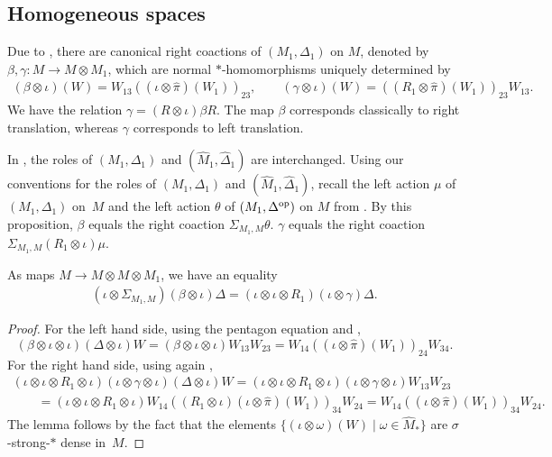 \subsection*{Homogeneous spaces}
Due to \cite[Proposition 3.1]{VaeVaiExt}, there are canonical right coactions of $(M_1, \Delta_1)$ on $M$, denoted by $\beta, \gamma: M \rightarrow M \otimes M_1$, which are normal $\ast$-homomorphisms uniquely determined by
\begin{gather}\label{EqnBeta}
 (\beta \otimes \iota)(W)  = W_{13} \left((\iota \otimes \hat{\pi})(W_1)\right)_{23}, \qquad
 (\gamma \otimes \iota)(W) =  \left((R_1 \otimes \hat{\pi})(W_1)\right)_{23} W_{13}.
\end{gather}
We have the relation $\gamma = (R \otimes \iota)  \beta  R$. The map $\beta$ corresponds classically to right translation, whereas $\gamma$ corresponds to left translation.

\begin{rmk}
 In \cite[Section 3]{VaeVaiExt}, the roles of $(M_1, \Delta_1)$ and $(\hat{M}_1, \hat{\Delta}_1)$ are interchanged. Using our conventions for the roles of $(M_1, \Delta_1)$ and $(\hat{M}_1, \hat{\Delta}_1)$, recall the left action $\mu$ of $(M_1, \Delta_1)$ on~$M$ and the left action $\theta$ of $(M_1, \Delta^{\rm op})$ on $M$ from \cite[Proposition~3.1]{VaeVaiExt}. By this proposition, $\beta$ equals the right coaction $\Sigma_{M_1, M}   \theta$. $\gamma$ equals the right coaction $\Sigma_{M_1, M} (R_1 \otimes \iota) \mu$.
\end{rmk}


\begin{lem}\label{LemInterchangeLR}
As maps $M \rightarrow M \otimes M \otimes M_1$, we have an equality
\begin{gather}
 (\iota \otimes \Sigma_{M_1, M}) (\beta \otimes \iota)  \Delta  = (\iota \otimes \iota \otimes R_1)(\iota \otimes \gamma) \Delta.\label{EqnGammaBetaRelI}
\end{gather}
\end{lem}
\begin{proof}
For the left hand side, using the pentagon equation and \cite[Proposition 3.1]{VaeVaiExt},
 \[
  (\beta \otimes \iota \otimes \iota)  (\Delta\otimes \iota) W = (\beta \otimes \iota \otimes \iota)  W_{13} W_{23} =
W_{14} ((\iota \otimes \hat{\pi})(W_1))_{24} W_{34}.
 \]
For the right hand side, using again \cite[Proposition 3.1]{VaeVaiExt},
\begin{gather*}
 (\iota \otimes \iota \otimes R_1 \otimes \iota)(\iota \otimes \gamma \otimes \iota) (\Delta \otimes \iota) W =
 (\iota \otimes \iota \otimes R_1 \otimes \iota)(\iota \otimes \gamma \otimes \iota) W_{13} W_{23} \\
\qquad {}=   (\iota \otimes \iota \otimes R_1 \otimes \iota) W_{14} ((R_1 \otimes \iota)(\iota \otimes \hat{\pi})(W_1))_{34} W_{24} =
W_{14} ((\iota \otimes \hat{\pi})(W_1))_{34} W_{24}.
\end{gather*}
The lemma follows by the fact that the elements $\{ (\iota \otimes \omega)(W) \mid \omega \in \hat{M}_\ast\}$ are $\sigma$-strong-$\ast$ dense in~$M$.
\end{proof}

